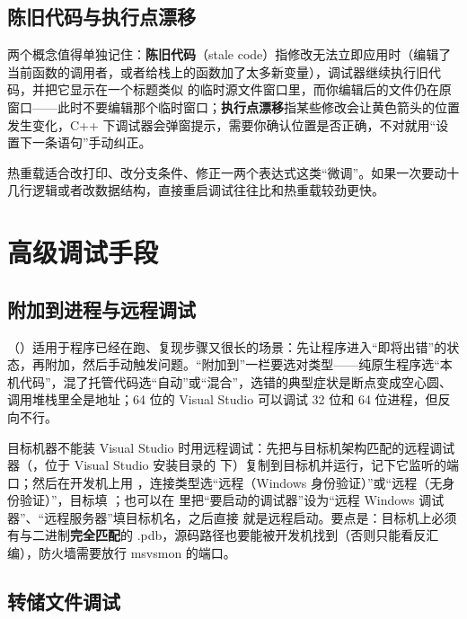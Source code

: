 {\subsection{陈旧代码与执行点漂移}

两个概念值得单独记住：\textbf{陈旧代码}（stale code）指修改无法立即应用时（编辑了当前函数的调用者，或者给栈上的函数加了太多新变量），调试器继续执行旧代码，并把它显示在一个标题类似  的临时源文件窗口里，而你编辑后的文件仍在原窗口——此时不要编辑那个临时窗口；\textbf{执行点漂移}指某些修改会让黄色箭头的位置发生变化，C++ 下调试器会弹窗提示，需要你确认位置是否正确，不对就用“设置下一条语句”手动纠正。

\begin{tipbox}[提示]
热重载适合改打印、改分支条件、修正一两个表达式这类“微调”。如果一次要动十几行逻辑或者改数据结构，直接重启调试往往比和热重载较劲更快。
\end{tipbox}

\section{高级调试手段}

\subsection{附加到进程与远程调试}

（）适用于程序已经在跑、复现步骤又很长的场景：先让程序进入“即将出错”的状态，再附加，然后手动触发问题。“附加到”一栏要选对类型——纯原生程序选“本机代码”，混了托管代码选“自动”或“混合”，选错的典型症状是断点变成空心圆、调用堆栈里全是地址；64 位的 Visual Studio 可以调试 32 位和 64 位进程，但反向不行。

目标机器不能装 Visual Studio 时用远程调试：先把与目标机架构匹配的远程调试器（，位于 Visual Studio 安装目录的  下）复制到目标机并运行，记下它监听的端口；然后在开发机上用 ，连接类型选“远程（Windows 身份验证）”或“远程（无身份验证）”，目标填 ；也可以在  里把“要启动的调试器”设为“远程 Windows 调试器”、“远程服务器”填目标机名，之后直接  就是远程启动。要点是：目标机上必须有与二进制\textbf{完全匹配}的 .pdb，源码路径也要能被开发机找到（否则只能看反汇编），防火墙需要放行 msvsmon 的端口。

\subsection{转储文件调试}

}
